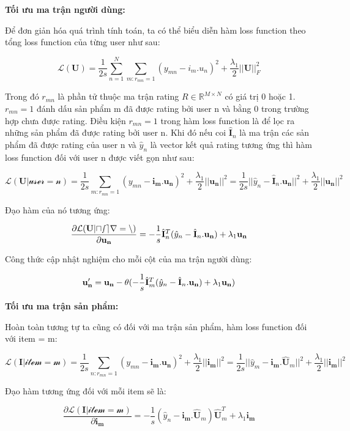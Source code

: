\documentclass[11pt]{article}
\begin{document}
\textbf{Tối ưu ma trận người dùng:}

Để đơn giản hóa quá trình tính toán, ta có thể biểu diễn hàm loss
function theo tổng loss function của từng user như sau:

\[\mathcal{L(\mathbf{U})} = \frac{1}{2s}\sum_{n = 1}^{N}\sum_{m: r_{mn} = 1} (y_{mn} - i_m . u_n)^2+\frac{\lambda_1}{2} ||\mathbf{U}||_{F}^2\]

Trong đó \(r_{mn}\) là phần tử thuộc ma trận rating
\(R \in \mathbb{R}^{M \times N}\) có giá trị 0 hoặc 1. \(r_{mn} = 1\)
đánh dấu sản phẩm m đã được rating bởi user n và bằng 0 trong trường hợp
chưa được rating. Điều kiện \(r_{mn} = 1\) trong hàm loss function là để
lọc ra những sản phẩm đã được rating bởi user n. Khi đó nếu coi
\(\hat{\mathbf{I}}_n\) là ma trận các sản phẩm đã được rating của user n
và \(\hat{y}_n\) là vector kết quả rating tương ứng thì hàm loss
function đối với user n được viết gọn như sau:

\[\mathcal{L(\mathbf{U}| user = n)} = \frac{1}{2s}\sum_{m: r_{mn} = 1}(y_{mn} - \mathbf{i_m} . \mathbf{u_n})^2 + \frac{\lambda_1}{2}||\mathbf{u_n}||^2 = \frac{1}{2s}||\hat{y}_n-\hat{\mathbf{I}}_n. \mathbf{u_n}||^2 + \frac{\lambda_1}{2}||\mathbf{u_n}||^2\]

Đạo hàm của nó tương ứng:

\[\frac{\partial \mathcal{L(\mathbf{U}| user = n)}}{\partial \mathbf{u_n}} = -\frac{1}{s}\hat{\mathbf{I}}_n^{T}\space (\hat{y}_n-\hat{\mathbf{I}}_n. \mathbf{u_n}) + \lambda_1\mathbf{u_n}\]

Công thức cập nhật nghiệm cho mỗi cột của ma trận người dùng:

\[\mathbf{u'_n} = \mathbf{u_n} - \theta (-\frac{1}{s}\hat{\mathbf{I}}_m^{T}\space (\hat{y}_n-\hat{\mathbf{I}}_n. \mathbf{u_n}) + \lambda_1\mathbf{u_n})\]

\textbf{Tối ưu ma trận sản phẩm:}

Hoàn toàn tương tự ta cũng có đối với ma trận sản phẩm, hàm loss
function đối với item = m:

\[\mathcal{L(\mathbf{I}| item = m)} = \frac{1}{2s}\sum_{n: r_{mn} = 1}(y_{mn} - \mathbf{i_m} . \mathbf{u_n})^2 + \frac{\lambda_1}{2}||\mathbf{i_m}||^2 = \frac{1}{2s}||\hat{y}_m-\mathbf{i_m}.\hat{\mathbf{U}}_m||^2 + \frac{\lambda_1}{2}||\mathbf{i_m}||^2\]

Đạo hàm tương ứng đối với mỗi item sẽ là:

\[\frac{\partial \mathcal{L(\mathbf{I}| item = m)}}{\partial \mathbf{i_m}} = -\frac{1}{s}(\hat{y}_n-\mathbf{i_m}. \hat{\mathbf{U}}_m)\hat{\mathbf{U}}_m^{T} + \lambda_1\mathbf{i_m}\]
\end{document}
